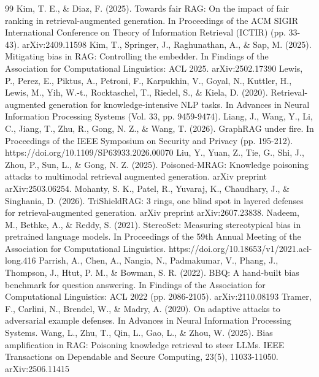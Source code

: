 \documentclass[authoryear,review,3p,times]{elsarticle}
\begin{document}
\begin{thebibliography}{99}
 Kim, T. E., \& Diaz, F. (2025). Towards fair RAG: On the impact of fair ranking in retrieval-augmented generation. In Proceedings of the ACM SIGIR International Conference on Theory of Information Retrieval (ICTIR) (pp. 33-43). arXiv:2409.11598
 Kim, T., Springer, J., Raghunathan, A., \& Sap, M. (2025). Mitigating bias in RAG: Controlling the embedder. In Findings of the Association for Computational Linguistics: ACL 2025. arXiv:2502.17390
 Lewis, P., Perez, E., Piktus, A., Petroni, F., Karpukhin, V., Goyal, N., Kuttler, H., Lewis, M., Yih, W.-t., Rocktaschel, T., Riedel, S., \& Kiela, D. (2020). Retrieval-augmented generation for knowledge-intensive NLP tasks. In Advances in Neural Information Processing Systems (Vol. 33, pp. 9459-9474).
 Liang, J., Wang, Y., Li, C., Jiang, T., Zhu, R., Gong, N. Z., \& Wang, T. (2026). GraphRAG under fire. In Proceedings of the IEEE Symposium on Security and Privacy (pp. 195-212). https://doi.org/10.1109/SP63933.2026.00070
 Liu, Y., Yuan, Z., Tie, G., Shi, J., Zhou, P., Sun, L., \& Gong, N. Z. (2025). Poisoned-MRAG: Knowledge poisoning attacks to multimodal retrieval augmented generation. arXiv preprint arXiv:2503.06254.
 Mohanty, S. K., Patel, R., Yuvaraj, K., Chaudhary, J., \& Singhania, D. (2026). TriShieldRAG: 3 rings, one blind spot in layered defenses for retrieval-augmented generation. arXiv preprint arXiv:2607.23838.
 Nadeem, M., Bethke, A., \& Reddy, S. (2021). StereoSet: Measuring stereotypical bias in pretrained language models. In Proceedings of the 59th Annual Meeting of the Association for Computational Linguistics. https://doi.org/10.18653/v1/2021.acl-long.416
 Parrish, A., Chen, A., Nangia, N., Padmakumar, V., Phang, J., Thompson, J., Htut, P. M., \& Bowman, S. R. (2022). BBQ: A hand-built bias benchmark for question answering. In Findings of the Association for Computational Linguistics: ACL 2022 (pp. 2086-2105). arXiv:2110.08193
 Tramer, F., Carlini, N., Brendel, W., \& Madry, A. (2020). On adaptive attacks to adversarial example defenses. In Advances in Neural Information Processing Systems.
 Wang, L., Zhu, T., Qin, L., Gao, L., \& Zhou, W. (2025). Bias amplification in RAG: Poisoning knowledge retrieval to steer LLMs. IEEE Transactions on Dependable and Secure Computing, 23(5), 11033-11050. arXiv:2506.11415

\end{thebibliography}
\end{document}
